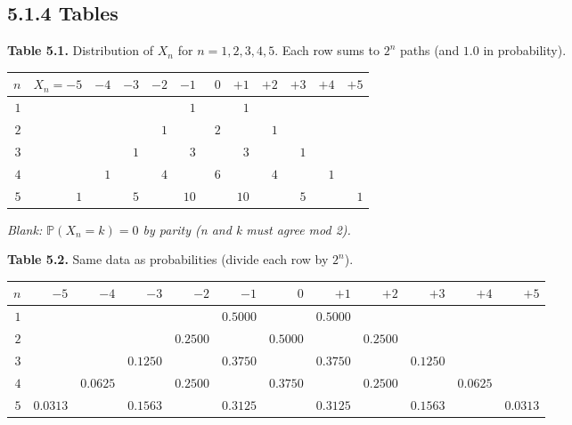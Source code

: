 \documentclass[
  10pt,
  twoside]{book}
\newcounter{none} %
\begin{document}
\subsection{5.1.4 Tables}\label{tables-11}

\textbf{Table 5.1.} Distribution of \(X_n\) for \(n = 1, 2, 3, 4, 5\).
Each row sums to \(2^n\) paths (and \(1.0\) in probability).

{\def\LTcaptype{none} %
\begin{table}[H]
\centering
\begin{tabular}{|r|r|r|r|r|r|r|r|r|r|r|r|}
\toprule
\(n\) & \(X_n = -5\) & \(-4\) & \(-3\) & \(-2\) & \(-1\) & \(0\) & \(+1\) & \(+2\) & \(+3\) & \(+4\) & \(+5\) \\
\midrule



\(1\) & & & & & \(\phantom{0}1\) & & \(\phantom{0}1\) & & & & \\
\(2\) & & & & \(\phantom{0}1\) & & \(\phantom{0}2\) & & \(\phantom{0}1\)
& & & \\
\(3\) & & & \(1\) & & \(\phantom{0}3\) & & \(\phantom{0}3\) & & \(1\) &
& \\
\(4\) & & \(1\) & & \(\phantom{0}4\) & & \(\phantom{0}6\) & &
\(\phantom{0}4\) & & \(1\) & \\
\(5\) & \(1\) & & \(5\) & & \(10\) & & \(10\) & & \(5\) & & \(1\) \\
\bottomrule
\end{tabular}
\end{table}
}

\emph{Blank: \(\mathbb P(X_n = k) = 0\) by parity (n and k must agree
mod 2).}

\textbf{Table 5.2.} Same data as probabilities (divide each row by
\(2^n\)).

{\def\LTcaptype{none} %
\begin{table}[H]
\centering
\begin{tabular}{|r|r|r|r|r|r|r|r|r|r|r|r|}
\toprule
\(n\) & \(-5\) & \(-4\) & \(-3\) & \(-2\) & \(-1\) & \(0\) & \(+1\) & \(+2\) & \(+3\) & \(+4\) & \(+5\) \\
\midrule



\(1\) & & & & & \(0.5000\) & & \(0.5000\) & & & & \\
\(2\) & & & & \(0.2500\) & & \(0.5000\) & & \(0.2500\) & & & \\
\(3\) & & & \(0.1250\) & & \(0.3750\) & & \(0.3750\) & & \(0.1250\) &
& \\
\(4\) & & \(0.0625\) & & \(0.2500\) & & \(0.3750\) & & \(0.2500\) & &
\(0.0625\) & \\
\(5\) & \(0.0313\) & & \(0.1563\) & & \(0.3125\) & & \(0.3125\) & &
\(0.1563\) & & \(0.0313\) \\
\bottomrule
\end{tabular}
\end{table}
}
\end{document}
